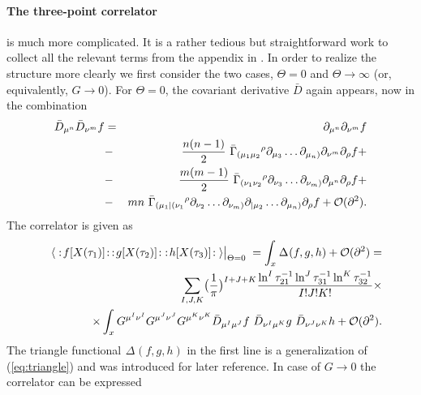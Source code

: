 \documentclass[a4paper,11pt]{article}               \def\new#1\endnew{{\bf #1}}
\let\bra=\langle        \let\ket=\rangle
\newcommand {\cO}{{\cal O}}
\newcommand {\tri}[2] {{}_{#1}\Delta_{#2}}
\begin{document}
\paragraph{The three-point correlator}\hspace*{-0.3cm}
is much more complicated. It is a
rather tedious but straightforward work to collect all the 
relevant terms from the appendix in \cite{Herbst:2001ai}. 
In order to realize the structure more clearly we
first consider the two cases, $\Theta = 0$ and $\Theta \rightarrow \infty$
(or, equivalently, $G \rightarrow 0$). 
For $\Theta = 0$, the covariant derivative $\bar D$ again appears, now
in the combination
\begin{eqnarray}
  \label{eq:DoubleDer}
  \bar D_{\mu^n} \bar D_{\nu^m} f &=& 
                     \partial_{\mu^n}\partial_{\nu^m} f
\nonumber\\
                 &-& \frac {n(n-1)}{2}~\bar\Gamma_{(\mu_1\mu_2}{}^\rho
                     \partial_{\mu_3}\ldots\partial_{\mu_n)}
                     \partial_{\nu^m} \partial_{\rho} f +
\nonumber\\
                 &-& \frac {m(m-1)}{2}~\bar\Gamma_{(\nu_1\nu_2}{}^\rho
                     \partial_{\nu_3}\ldots\partial_{\nu_m)}
                     \partial_{\mu^n} \partial_{\rho} f +
\nonumber\\
                 &-& mn~\bar\Gamma_{(\mu_1|(\nu_1}{}^\rho
                     \partial_{\nu_2}\ldots\partial_{\nu_m)}
                     \partial_{|\mu_2}\ldots\partial_{\mu_n)}
                     \partial_{\rho} f +
                     \cO(\partial^2).
\end{eqnarray}
The correlator is given as
\begin{eqnarray}
  \label{eq:3pCorrG}
  &&\bra\;:\!f[X(\tau_1)]\!: \, :\!g[X(\tau_2)]\!:\; :\!h[X(\tau_3)]\!:\;\ket
  \bigr|_{\Theta = 0} \; = 
  \int _x \tri{}{}(f,g,h) + \cO(\partial^2) =
\nonumber\\
  &&\sum _{I,J,K} \bigl( \frac 1\pi \bigr)^{I+J+K} 
  \frac {\ln^I\tau_{21}^{-1} \ln^J\tau_{31}^{-1} \ln^K\tau_{32}^{-1}}
        {I! J! K!} \times 
\nonumber\\
  &&\times\int _x G^{\mu^I\nu^I}G^{\mu^J\nu^J}G^{\mu^K\nu^K} 
         \bar D_{\mu^I\mu^J} f ~ \bar D_{\nu^I\mu^K} g ~ \bar D_{\nu^J\nu^K} h
  + \cO(\partial^2) .
\end{eqnarray}
The triangle functional $\tri{}{}(f,g,h)$ in the first line is a
generalization of (\ref{eq:triangle}) and was introduced for later
reference. 
In case of $G \rightarrow 0$ the correlator can be expressed 
\end{document}
